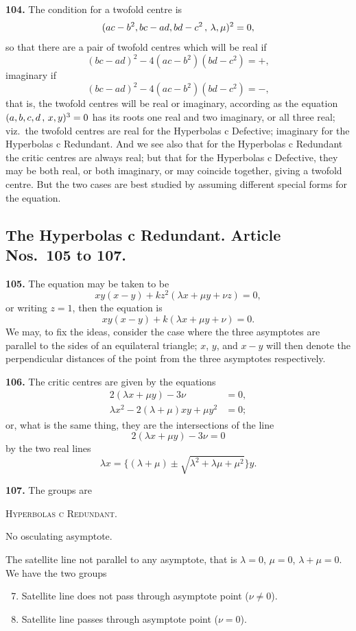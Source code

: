 \documentclass[11pt,a4paper]{article}
\theoremstyle{plain}
\begin{document}
\noindent\textbf{104.} The condition for a twofold centre is
\[
(ac - b^2, bc - ad, bd - c^2 \, \char`\,\, \lambda, \mu)^2 = 0,
\]
so that there are a pair of twofold centres which will be real if
\[
(bc - ad)^2 - 4(ac - b^2)(bd - c^2) = +,
\]
imaginary if
\[
(bc - ad)^2 - 4(ac - b^2)(bd - c^2) = -,
\]
that is, the twofold centres will be real or imaginary, according as the equation $(a, b, c, d \, \char`\,\, x, y)^3 = 0$ has its roots one real and two imaginary, or all three real; viz.\ the twofold centres are real for the Hyperbolas c Defective; imaginary for the Hyperbolas c Redundant. And we see also that for the Hyperbolas c Redundant the critic centres are always real; but that for the Hyperbolas c Defective, they may be both real, or both imaginary, or may coincide together, giving a twofold centre. But the two cases are best studied by assuming different special forms for the equation.

\subsection*{The Hyperbolas c Redundant. Article Nos.\ 105 to 107.}

\noindent\textbf{105.} The equation may be taken to be
\[
xy(x-y) + kz^2(\lambda x + \mu y + \nu z) = 0,
\]
or writing $z=1$, then the equation is
\[
xy(x-y) + k(\lambda x + \mu y + \nu) = 0.
\]
We may, to fix the ideas, consider the case where the three asymptotes are parallel to the sides of an equilateral triangle; $x$, $y$, and $x-y$ will then denote the perpendicular distances of the point from the three asymptotes respectively.

\noindent\textbf{106.} The critic centres are given by the equations
\begin{align*}
2(\lambda x + \mu y) - 3\nu &= 0,\\
\lambda x^2 - 2(\lambda + \mu)xy + \mu y^2 &= 0;
\end{align*}
or, what is the same thing, they are the intersections of the line
\[
2(\lambda x + \mu y) - 3\nu = 0
\]
by the two real lines
\[
\lambda x = \{(\lambda + \mu) \pm \sqrt{\lambda^2 + \lambda\mu + \mu^2}\}y.
\]

\noindent\textbf{107.} The groups are

\textsc{Hyperbolas c Redundant.}

No osculating asymptote.

The satellite line not parallel to any asymptote, that is $\lambda = 0$, $\mu = 0$, $\lambda + \mu = 0$. We have the two groups
\begin{enumerate}[label=\textsc{\Roman*.},nosep]
\setcounter{enumi}{6}
\item Satellite line does not pass through asymptote point ($\nu \neq 0$).
\item Satellite line passes through asymptote point ($\nu = 0$).
\end{enumerate}
\end{document}
